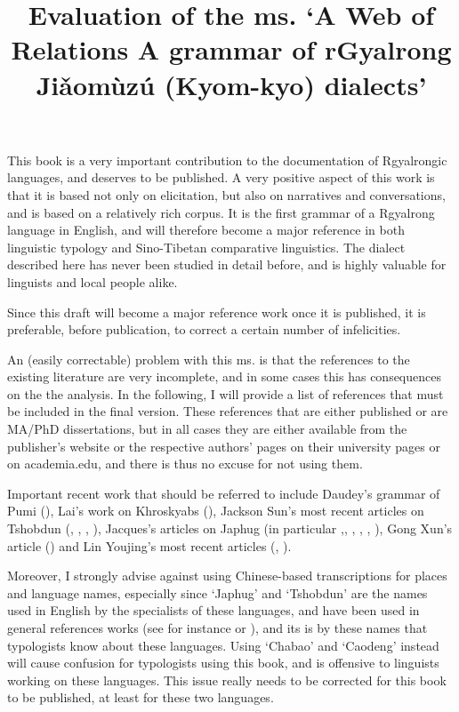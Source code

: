 \documentclass[oldfontcommands,oneside,a4paper,11pt]{article}
\begin{document}
 
\title{Evaluation of the ms. `A Web of Relations A grammar of rGyalrong Jiǎomùzú (Kyom-kyo) dialects'} 
\maketitle 
\sloppy

 This book is a very important contribution to the documentation of Rgyalrongic languages, and deserves to be published. A very positive aspect of this work is that it is based not only on elicitation, but also on narratives and conversations, and is based on a relatively rich corpus. It is the first grammar of a Rgyalrong language in English, and will therefore become a major reference in both linguistic typology and Sino-Tibetan comparative linguistics.  The dialect described here has never been studied in detail before, and is highly valuable for linguists and local people alike.
 
Since this draft will become a major reference work once it is published, it is preferable, before publication, to correct a certain number of infelicities.

An (easily correctable) problem with this ms. is that the references to the existing literature are very incomplete, and in some cases this has consequences on the the analysis. In the following, I will provide a list of references that must be included in the final version. These references that are either published or are MA/PhD dissertations, but in all cases they are either available from the publisher's website or the respective authors' pages on their university pages or on academia.edu, and there is thus no excuse for not using them.

Important recent work that should be referred to include Daudey's grammar of Pumi (\citealt{daudey14grammar}), Lai's work on Khroskyabs (\citealt{lai13affixale}), Jackson Sun's most recent articles on Tshobdun (\citet{sun12complementation}, \citet{sun14generic}, \citet{jackson07irrealis}, \citet{jackson14morpho}), Jacques's articles on Japhug (in particular \citet{jacques13tropative},\citet{jacques12incorp}, \citet{jacques13harmonization}, \citet{japhug14ideophones}, \citet{jacques14linking}, \citet{jacques14antipassive}), Gong Xun's article (\citealt{gongxun14agreement}) and Lin Youjing's most recent articles (\citealt{lin11direction},  \citealt{linyj12tone}).

Moreover, I strongly advise against using Chinese-based transcriptions for places and language names, especially since `Japhug' and `Tshobdun' are the names used in English by the specialists of these languages, and have been used in general references works (see for instance \citealt{jackson14morpho} or \citealt{jacques13harmonization}), and its is by these names that typologists know about these languages. Using `Chabao' and `Caodeng' instead will cause confusion for typologists using this book, and is offensive to linguists working on these languages. This issue really needs to be corrected for this book to be published, at least for these two languages.
\end{document}
